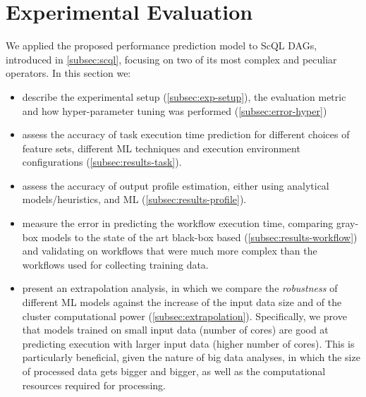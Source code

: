 \documentclass[a4paper, 10pt, conference]{ieeeconf}      %
\begin{document}
\section{Experimental Evaluation}
\label{section:evaluation}
We applied the proposed performance prediction model to ScQL DAGs, introduced in \ref{subsec:scql}, focusing on two of its most complex and peculiar operators. In this section we:
\begin{itemize}
    \item describe the experimental setup (\ref{subsec:exp-setup}), the evaluation metric and how hyper-parameter tuning was performed (\ref{subsec:error-hyper})
    \item assess the accuracy of task execution time prediction for different choices of feature sets, different ML techniques and execution environment configurations (\ref{subsec:results-task}).
    \item assess the accuracy of output profile estimation, either using analytical models/heuristics, and ML (\ref{subsec:results-profile}).
    \item measure the error in predicting the workflow execution time, comparing  gray-box models to the state of the art black-box based (\ref{subsec:results-workflow}) and validating on workflows that were much more complex than the workflows used for collecting training data.
    \item present an extrapolation analysis, in which we compare the \textit{robustness}  of different ML models against the increase of the input data size and of the cluster computational power (\ref{subsec:extrapolation}). Specifically, we prove that models trained on small input data (number of cores) are good at predicting execution with larger input data (higher number of cores). This is particularly beneficial, given the nature of big data analyses, in which the size of processed data gets bigger and bigger, as well as the computational resources required for processing.
\end{itemize}


\color{black}
\color{black}
\end{document}
